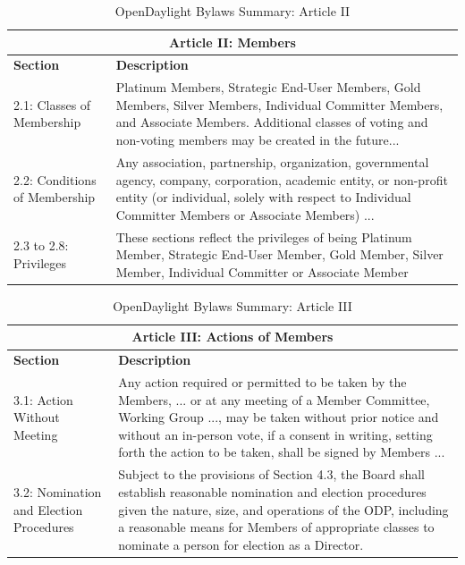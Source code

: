 \documentclass[a4paper, 12pt]{book}
\begin{document}
{\begin{table}[H]
  \begin{center}
    \begin{tabular}{ | p{4cm} | p{11cm} | }
    \toprule
    \multicolumn {2}{|c|}{\textbf{Article II: Members}} \\
    \hline
    \textbf{Section} & \textbf{Description} \\
    \hline
    2.1: Classes of Membership & Platinum Members, Strategic End-User Members, Gold Members, Silver Members, Individual Committer Members, and Associate Members. Additional classes of voting and non-voting members may be created in the future...\\
    \hline
    2.2: Conditions of Membership & Any association, partnership, organization, governmental agency, company, corporation, academic entity, or non-profit entity (or individual, solely with respect to Individual Committer Members or Associate Members) ...\\
    \hline
    2.3 to 2.8: Privileges & These sections reflect the privileges of being Platinum Member, Strategic End-User Member, Gold Member, Silver Member, Individual Committer or Associate Member\\
    \bottomrule
    \end{tabular}
    \caption{OpenDaylight Bylaws Summary: Article II}
    \label{tab:odlbylaws-art02}
  \end{center}
\end{table}

\begin{table}[H]
  \begin{center}
    \begin{tabular}{ | p{4cm} | p{11cm} | }
    \toprule
    \multicolumn {2}{|c|}{\textbf{Article III: Actions of Members}} \\
    \hline
    \textbf{Section} & \textbf{Description} \\
    \hline
    3.1: Action Without Meeting & Any action required or permitted to be taken by the Members, ... or at any meeting of a Member Committee, Working Group ..., may be taken without prior notice and without an in-person vote, if a consent in writing, setting forth the action to be taken, shall be signed by Members ...\\
    \hline
    3.2: Nomination and Election Procedures & Subject to the provisions of Section 4.3, the Board shall establish reasonable nomination and election procedures given the nature, size, and operations of the ODP, including a reasonable means for Members of appropriate classes to nominate a person for election as a Director.\\
    \bottomrule
    \end{tabular}
    \caption{OpenDaylight Bylaws Summary: Article III}
    \label{tab:odlbylaws-art03}
  \end{center}
\end{table}

}
\end{document}
